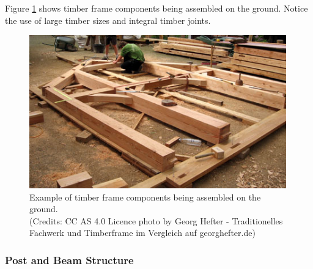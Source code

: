 Figure \ref{fig:example-timber-frame-on-ground} shows timber frame components being assembled on the ground. Notice the use of large timber sizes and integral timber joints. 

\begin{figure}
    \centering
    \includegraphics[width=0.99\textwidth]{images/01/Fachwerk_Abbund.jpg}
    \caption{Example of timber frame components being assembled on the ground. \\
        \footnotesize{(Credits: CC AS 4.0 Licence photo by Georg Hefter - Traditionelles Fachwerk und Timberframe im Vergleich auf georghefter.de)}}
    \label{fig:example-timber-frame-on-ground}
\end{figure}

\subsubsection{Post and Beam Structure}
\label{subsubsection:introduction-post-and-beam-structure}

